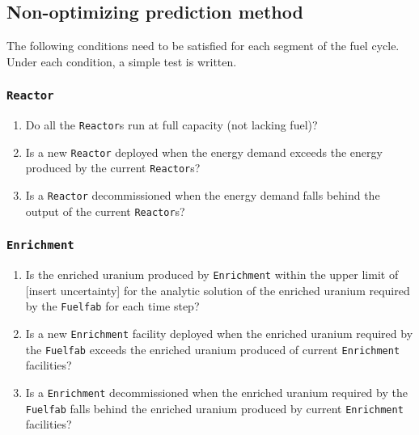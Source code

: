 \documentclass[12pt,letterpaper]{article}
\begin{document}
\subsection{Non-optimizing prediction method}
The following conditions need to be satisfied for each segment of the fuel cycle. Under each condition, a simple test is written. 

\subsubsection{\texttt{Reactor}}

\begin{enumerate}
\item  Do all the \texttt{Reactor}s run at full capacity (not lacking fuel)? 

\item Is a new \texttt{Reactor} deployed when the energy demand exceeds the energy produced by the current \texttt{Reactor}s? 

\item Is a \texttt{Reactor} decommissioned when the energy demand falls behind the output of the current \texttt{Reactor}s? 

\end{enumerate}

\subsubsection{\texttt{Enrichment}}
\begin{enumerate}
\item  Is the enriched uranium produced by \texttt{Enrichment} within the upper limit of [insert uncertainty] for the analytic solution of the enriched uranium required by the \texttt{Fuelfab} for each time step? 

\item Is a new \texttt{Enrichment} facility deployed when the enriched uranium required by the \texttt{Fuelfab} exceeds the enriched uranium produced of current \texttt{Enrichment} facilities?

\item Is a \texttt{Enrichment} decommissioned when the enriched uranium required by the \texttt{Fuelfab} falls behind the enriched uranium produced by current \texttt{Enrichment} facilities?
\end{enumerate}
\end{document}
